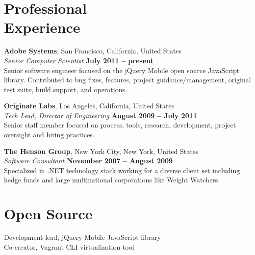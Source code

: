 \documentclass[margin,line]{resume}
\begin{document}
\begin{resume}
  \section{\mysidestyle Professional\\Experience}

  \textbf{Adobe Systems}, San Francisco, California, United States \vspace{2mm}\\\vspace{1mm}%
  \textsl{Senior Computer Scientist} \hfill \textbf{July 2011 -- present}\\
  Senior software engineer focused on the jQuery Mobile open source JavaScript library. Contributed to bug fixes, features, project guidance/management, original test suite, build support, and operations.

  \textbf{Originate Labs}, Los Angeles, California, United States \vspace{2mm}\\\vspace{1mm}%
  \textsl{Tech Lead, Director of Engineering} \hfill \textbf{August 2009 -- July 2011}\\
  Senior staff member focused on process, tools, research, development, project oversight and hiring practices.

  \textbf{The Henson Group}, New York City, New York, United States \vspace{2mm}\\\vspace{1mm}%
  \textsl{Software Consultant} \hfill \textbf{November 2007 -- August 2009}\\
  Specialized in .NET technology stack working for a diverse client set including hedge funds and large multinational corporations like Weight Watchers.

  \clearpage
  \section{\mysidestyle Open Source}

  Development lead, jQuery Mobile JavaScript library
  \vspace{1mm}\\
  Co-creator, Vagrant CLI virtualization tool
  \vspace{1mm}\\


\end{resume}
\end{document}
